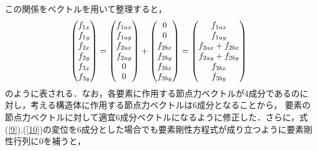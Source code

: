 \documentclass[a4paper,11pt,uplatex]{jsarticle}
\begin{document}
この関係をベクトルを用いて整理すると，
\begin{align}
  \begin{pmatrix} f_{1x} \\ f_{1y} \\ f_{2x} \\ f_{2y} \\ f_{3x} \\f_{3y} \end{pmatrix} = \begin{pmatrix} f_{1ax} \\ f_{1ay} \\ f_{2ax} \\ f_{2ay} \\ 0\\0 \end{pmatrix} +
  \begin{pmatrix} 0 \\ 0 \\f_{2bx} \\ f_{2by} \\ f_{3bx} \\ f_{3by} \end{pmatrix} = \begin{pmatrix} f_{1ax} \\ f_{1ay} \\ f_{2ax} + f_{2bx} \\ f_{2ay} + f_{2by} \\ f_{3bx} \\ f_{3by} \end{pmatrix}
\end{align}
のように表される．なお，各要素に作用する節点力ベクトルが4成分であるのに対し，考える構造体に作用する節点力ベクトルは6成分となることから，
要素の節点力ベクトルに対して適宜6成分ベクトルになるように修正した．さらに，式(\ref{9}),(\ref{10})の変位を6成分とした場合でも要素剛性方程式が成り立つように要素剛性行列に0を補うと，
\end{document}
